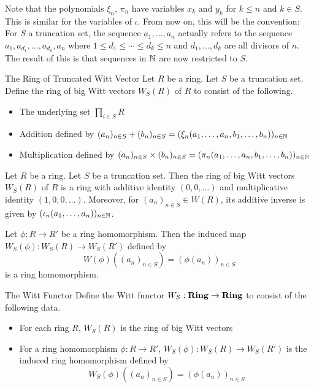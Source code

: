 \documentclass[a4paper]{article}
\begin{document}
Note that the polynomials $\xi_n$, $\pi_n$ have variables $x_k$ and $y_k$ for $k\leq n$ and $k\in S$. This is similar for the variables of $\iota$. From now on, this will be the convention: For $S$ a truncation set, the sequence $a_1,\dots,a_n$ actually refers to the sequence $a_1,a_{d_1},\dots,a_{d_k},a_n$ where $1\leq d_1\leq\cdots\leq d_k\leq n$ and $d_1,\dots,d_k$ are all divisors of $n$. The result of this is that sequences in $\mathbb{N}$ are now restricted to $S$. 

\begin{defn}{The Ring of Truncated Witt Vector}{} Let $R$ be a ring. Let $S$ be a truncation set. Define the ring of big Witt vectors $W_S(R)$ of $R$ to consist of the following. 
\begin{itemize}
\item The underlying set $\prod_{i\in S}R$
\item Addition defined by $(a_n)_{n\in S}+(b_n)_{n\in S}=(\xi_n(a_1,\dots,a_n,b_1,\dots,b_n))_{n\in\mathbb{N}}$
\item Multiplication defined by $(a_n)_{n\in S}\times(b_n)_{n\in S}=(\pi_n(a_1,\dots,a_n,b_1,\dots,b_n))_{n\in\mathbb{N}}$
\end{itemize}
\end{defn}

\begin{thm}{}{} Let $R$ be a ring. Let $S$ be a truncation set. Then the ring of big Witt vectors $W_S(R)$ of $R$ is a ring with additive identity $(0,0,\dots)$ and multiplicative identity $(1,0,0,\dots)$. Moreover, for $(a_n)_{n\in S}\in W(R)$, its additive inverse is given by $(\iota_n(a_1,\dots,a_n))_{n\in\mathbb{N}}$.
\end{thm}

\begin{prp}{}{} Let $\phi:R\to R'$ be a ring homomorphism. Then the induced map $W_S(\phi):W_S(R)\to W_S(R')$ defined by $$W(\phi)((a_n)_{n\in S})=(\phi(a_n))_{n\in S}$$ is a ring homomorphism. 
\end{prp}

\begin{defn}{The Witt Functor}{} Define the Witt functor $W_S:\bold{Ring}\to\bold{Ring}$ to consist of the following data. 
\begin{itemize}
\item For each ring $R$, $W_S(R)$ is the ring of big Witt vectors
\item For a ring homomorphism $\phi:R\to R'$, $W_S(\phi):W_S(R)\to W_S(R')$ is the induced ring homomorphism defined by $$W_S(\phi)((a_n)_{n\in S})=(\phi(a_n))_{n\in S}$$
\end{itemize}
\end{defn}
\end{document}
